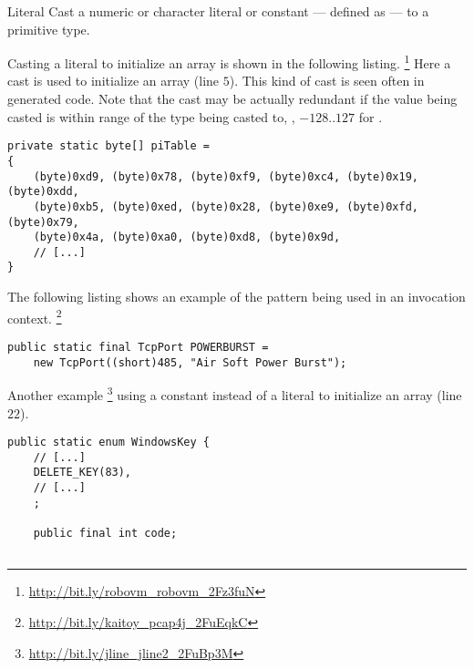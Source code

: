 \begin{pattern}{Literal}
%
%
Cast a numeric or character literal or constant --- defined as  ---
to a primitive type.

\instances{}
Casting a literal to initialize an array is shown in the following listing.%
\footnote{\url{http://bit.ly/robovm_robovm_2Fz3fuN}}
Here a cast is used to initialize an array (line $5$).
This kind of cast is seen often in generated code.
Note that the cast may be actually redundant if the value being casted
is within range of the type being casted to,
\eg{}, $-128..127$ for .

\begin{verbatim}
private static byte[] piTable =
{
    (byte)0xd9, (byte)0x78, (byte)0xf9, (byte)0xc4, (byte)0x19, (byte)0xdd,
    (byte)0xb5, (byte)0xed, (byte)0x28, (byte)0xe9, (byte)0xfd, (byte)0x79,
    (byte)0x4a, (byte)0xa0, (byte)0xd8, (byte)0x9d, 
    // [...]
}
\end{verbatim}

The following listing shows an example of the \thisp{} pattern
being used in an invocation context.%
\footnote{\url{http://bit.ly/kaitoy_pcap4j_2FuEqkC}}

\begin{verbatim}
public static final TcpPort POWERBURST =
    new TcpPort((short)485, "Air Soft Power Burst");
\end{verbatim}

Another example%
\footnote{\url{http://bit.ly/jline_jline2_2FuBp3M}}
using a constant instead of a literal to initialize
an array (line $22$).

\begin{verbatim}
public static enum WindowsKey {
    // [...]
    DELETE_KEY(83), 
    // [...]
    ;

    public final int code;


\end{verbatim}
\end{pattern}
